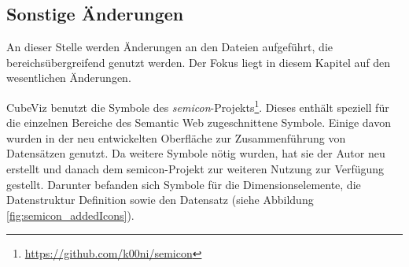 \documentclass[11pt]{article}
\begin{document}
%
%
\subsection{Sonstige Änderungen}
\label{sec:chapterMiscAdaptions}

An dieser Stelle werden Änderungen an den Dateien aufgeführt, die bereichsübergreifend genutzt werden. Der Fokus liegt in diesem Kapitel auf den wesentlichen Änderungen.

CubeViz benutzt die Symbole des \textit{semicon}-Projekts\footnote{\url{https://github.com/k00ni/semicon}}. Dieses enthält speziell für die einzelnen Bereiche des Semantic Web zugeschnittene Symbole. Einige davon wurden in der neu entwickelten Oberfläche zur Zusammenführung von Datensätzen genutzt. Da weitere Symbole nötig wurden, hat sie der Autor neu erstellt und danach dem semicon-Projekt zur weiteren Nutzung zur Verfügung gestellt. Darunter befanden sich Symbole für die Dimensionselemente, die Datenstruktur Definition sowie den Datensatz (siehe Abbildung \ref{fig:semicon_addedIcons}). \\
\end{document}
